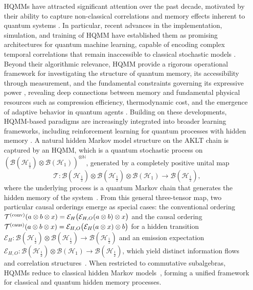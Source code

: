 \documentclass[11pt,a4paper]{article}
\begin{document}
HQMMs have attracted significant attention over the past decade, motivated by their ability to capture non-classical correlations and memory effects inherent to quantum systems \cite{AGLS24Q, Monras11,Srin2017}. In particular, recent advances in the implementation, simulation, and training of HQMM have established them as promising architectures for quantum machine learning, capable of encoding complex temporal correlations that remain inaccessible to classical stochastic models \cite{SS23,MRDFS22,Li2024}. Beyond their algorithmic relevance, HQMM provide a rigorous operational framework for investigating the structure of quantum memory, its accessibility through measurement, and the fundamental constraints governing its expressive power \cite{FH21, Fanizza24}, revealing deep connections between memory and fundamental physical resources such as compression efficiency, thermodynamic cost, and the emergence of adaptive behavior in quantum agents \cite{Elliot21}. Building on these developments, HQMM-based paradigms are increasingly integrated into broader learning frameworks, including reinforcement learning for quantum processes with hidden memory \cite{TaElM23}. 
A natural hidden Markov model structure on the AKLT chain is captured by an HQMM, which is a quantum stochastic process on \(( \mathcal{B}(\mathcal{H}_{\frac{1}{2}}) \otimes \mathcal{B}(\mathcal{H}_1))^{\otimes\mathbb{N}}\), generated by a completely positive unital map
\[
\mathcal{T} : \mathcal{B}(\mathcal{H}_{\frac{1}{2}}) \otimes \mathcal{B}(\mathcal{H}_{\frac{1}{2}}) \otimes \mathcal{B}(\mathcal{H}_1) \longrightarrow \mathcal{B}(\mathcal{H}_{\frac{1}{2}}),
\]
where the underlying process is a quantum Markov chain that generates the hidden memory of the system~\cite{ASS20,FR15}. From this general three-tensor map, two particular causal orderings emerge as special cases: the conventional ordering \(\mathcal{T}^{(\rm conv)}(a\otimes b\otimes x) = \mathcal{E}_H\bigl(\mathcal{E}_{H,O}(a \otimes b) \otimes x\bigr)\) and the causal ordering \(\mathcal{T}^{(\rm caus)}(a\otimes b\otimes x) =  \mathcal{E}_{H,O}\bigl(\mathcal{E}_H(a \otimes x) \otimes b\bigr)\) for a hidden transition $\mathcal{E}_{H}:  \mathcal{B}(\mathcal{H}_{\frac{1}{2}}) \otimes \mathcal{B}(\mathcal{H}_{\frac{1}{2}})  \rightarrow \mathcal{B}(\mathcal{H}_{\frac{1}{2}}) $ and an emission expectation $\mathcal{E}_{H,O}:    \mathcal{B}(\mathcal{H}_{\frac{1}{2}}) \otimes \mathcal{B}(\mathcal{H}_1) \rightarrow \mathcal{B}(\mathcal{H}_{\frac{1}{2}})$, which yield distinct information flows and correlation structures~\cite{SouBarhqmm2026}. When restricted to commutative subalgebras, HQMMs reduce to classical hidden Markov models~\cite{rab89}, forming a unified framework for classical and quantum hidden memory processes.
\end{document}
